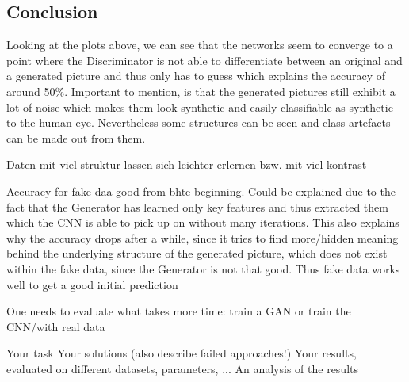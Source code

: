 \documentclass{article}
\begin{document}

\subsection{Conclusion}

Looking at the plots above, we can see that the networks seem to converge to a point where the Discriminator is not able to
differentiate between an original and a generated picture and thus only has to guess which explains the accuracy of around 50\%.
Important to mention, is that the generated pictures still exhibit a lot of noise which makes them look synthetic and easily
classifiable as synthetic to the human eye.
Nevertheless some structures can be seen and class artefacts can be made out from them.

Daten mit viel struktur lassen sich leichter erlernen bzw. mit viel kontrast

Accuracy for fake daa good from bhte beginning. Could be explained due to the fact that the Generator has learned only key features and thus
extracted them which the CNN is able to pick up on without many iterations. This also explains why the accuracy drops after a while, since
it tries to find more/hidden meaning behind the underlying structure of the generated picture, which does not exist within the fake data, since
the Generator is not that good.
Thus fake data works well to get a good initial prediction

One needs to evaluate what takes more time: train a GAN or train the CNN/with real data

Your task
Your solutions (also describe failed approaches!)
Your results, evaluated on different datasets, parameters, ...
An analysis of the results

\end{document}
